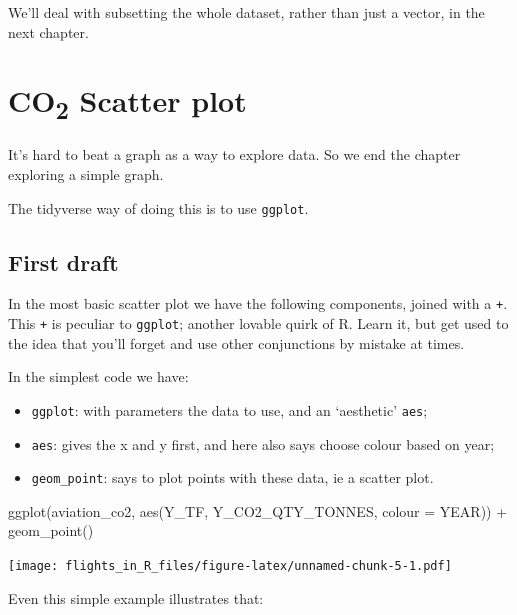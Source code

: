 \documentclass[
]{book}
\newenvironment{Shaded}{\begin{snugshade}}{\end{snugshade}}
\newcommand{\AttributeTok}[1]{\textcolor[rgb]{0.77,0.63,0.00}{#1}}
\newcommand{\FunctionTok}[1]{\textcolor[rgb]{0.00,0.00,0.00}{#1}}
\newcommand{\NormalTok}[1]{#1}
\newcommand{\SpecialCharTok}[1]{\textcolor[rgb]{0.00,0.00,0.00}{#1}}
\providecommand{\tightlist}{%
  \setlength{\itemsep}{0pt}\setlength{\parskip}{0pt}}
\begin{document}
We'll deal with subsetting the whole dataset, rather than just a vector, in the next chapter.

\hypertarget{co2-scatter-plot}{%
\section{\texorpdfstring{CO\textsubscript{2} Scatter plot}{CO2 Scatter plot}}\label{co2-scatter-plot}}

It's hard to beat a graph as a way to explore data. So we end the chapter exploring a simple graph.

The tidyverse way of doing this is to use \texttt{ggplot}.

\hypertarget{first-draft}{%
\subsection{First draft}\label{first-draft}}

In the most basic scatter plot we have the following components, joined with a \texttt{+}. This \texttt{+} is peculiar to \texttt{ggplot}; another lovable quirk of R. Learn it, but get used to the idea that you'll forget and use other conjunctions by mistake at times.

In the simplest code we have:

\begin{itemize}
\tightlist
\item
  \texttt{ggplot}: with parameters the data to use, and an `aesthetic' \texttt{aes};
\item
  \texttt{aes}: gives the x and y first, and here also says choose colour based on year;
\item
  \texttt{geom\_point}: says to plot points with these data, ie a scatter plot.
\end{itemize}

\begin{Shaded}
\begin{Highlighting}[]
\FunctionTok{ggplot}\NormalTok{(aviation\_co2, }
       \FunctionTok{aes}\NormalTok{(Y\_TF, Y\_CO2\_QTY\_TONNES, }\AttributeTok{colour =}\NormalTok{ YEAR)) }\SpecialCharTok{+}
  \FunctionTok{geom\_point}\NormalTok{() }
\end{Highlighting}
\end{Shaded}

\texttt{[image: flights\_in\_R\_files/figure-latex/unnamed-chunk-5-1.pdf]}

Even this simple example illustrates that:
\end{document}
